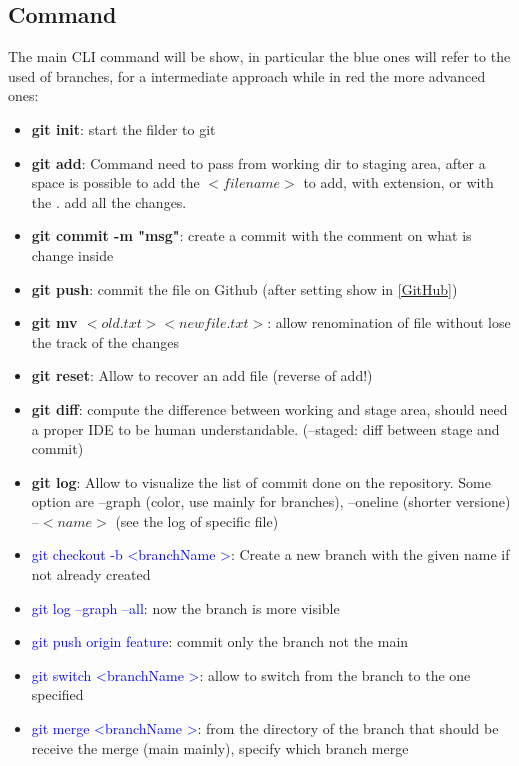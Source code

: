 \documentclass{report}
\begin{document}
\subsection{Command}
The main CLI command will be show, in particular the blue ones will refer to the used of branches, for a intermediate approach while in red the more advanced ones:
\begin{itemize}
    \item \textbf{git init}: start the filder to git 
    \item \textbf{git add}: Command need to pass from working dir to staging area, after a space is possible to add the $<filename>$ to add, with extension, or with the . add all the changes.
    \item \textbf{git commit -m "msg"}: create a commit with the comment on what is change inside
    \item \textbf{git push}: commit the file on Github (after setting show in \autoref{GitHub})
    \item  \textbf{git mv $<old.txt> <newfile.txt>$}: allow renomination of file without lose the track of the changes
    \item \textbf{git reset}: Allow to recover an add file (reverse of add!)
    \item  \textbf{git diff}: compute the difference between working and stage area, should need a proper IDE to be human understandable. (--staged: diff between stage and commit)
    \item \textbf{git log}: Allow to visualize the list of commit done on the repository. Some option are --graph (color, use mainly for branches), --oneline (shorter versione) --$<name>$ (see the log of specific file) 
    \item \textcolor{blue}{git checkout -b \textless branchName \textgreater}: Create a new branch with the given name if not already created
     \item \textcolor{blue}{git log --graph --all}: now the branch is more visible 
     \item \textcolor{blue}{git push origin feature}: commit only the branch not the main
     \item \textcolor{blue}{git switch \textless branchName \textgreater}: allow to switch from the branch to the one specified
     \item \textcolor{blue}{git merge \textless branchName \textgreater}: from the directory of the branch that should be receive the merge (main mainly), specify which branch merge \newline

\end{itemize}
\end{document}
